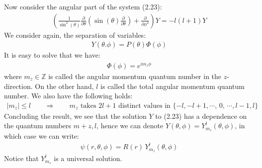\documentclass[11pt]{book}
\theoremstyle{break}
\theoremstyle{break}
\newcommand{\Z}{\mathbb{Z}}
\newcommand{\pd}{\partial}
\begin{document}
Now consider the angular part of the system (2.23):
\begin{align}
\left( \frac{1}{\sin^2(\theta)} \frac{\pd}{\pd \theta}\left( \sin(\theta) \frac{\pd}{\pd \theta}\right) +\frac{\pd}{\pd \phi^2}\right)Y = -l(l+1) Y
\end{align}
We consider again, the separation of variables:
\begin{align*}
Y(\theta.\phi) = P(\theta) \Phi(\phi)
\end{align*}
It is easy to solve that we have:
\begin{align*}
\Phi(\phi) = e^{im_z \phi}
\end{align*}
where $m_z \in \Z$ is called the angular momentum quantum number in the $z$-direction. On the other hand, $l$ is called the total angular momentum quantum number. We also have the following holds:
\begin{align*}
|m_z| \leq l \qquad \Rightarrow \qquad m_z \text{ takes }2l+1 \text{ distinct values in }\{-l,-l+1,\cdots,\, 0,\, \cdots, l-1, l\}
\end{align*}
Concluding the result, we see that the solution $Y$ to (2.23) has a dependence on the quantum numbers $m+z,l$, hence we can denote $Y(\theta, \phi) = Y_{m_z}^l(\theta, \phi)$, in which case we can write:
\begin{align*}
\psi(r,\theta,\phi)  = R(r) \, Y_{m_z}^l(\theta,\phi)
\end{align*}
Notice that $Y_{m_z}^l$ is a universal solution. 
\newpage
\end{document}
